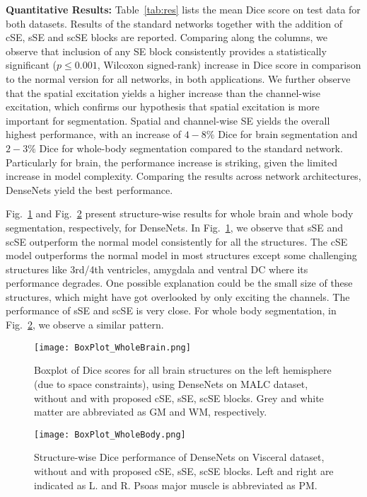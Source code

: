 \documentclass{llncs}
\begin{document}
\noindent
\textbf{Quantitative Results: }
Table~\ref{tab:res} lists the mean Dice score on test data for both datasets. Results of the standard networks together with the addition of cSE, sSE and scSE blocks are reported. Comparing along the columns, we observe that inclusion of any SE block consistently provides a statistically significant ($p\le0.001$, Wilcoxon signed-rank) increase in Dice score in comparison to the normal version for all networks, in both  applications. We further observe that the spatial excitation yields a higher increase than the channel-wise excitation, which confirms our hypothesis that spatial excitation is more important for segmentation. Spatial and channel-wise SE yields the overall highest performance, with an increase of $4-8 \%$ Dice for brain segmentation and $2-3 \%$ Dice for whole-body segmentation compared to the standard network. Particularly for brain, the performance increase is striking, given the limited increase in model complexity. Comparing the results across network architectures, DenseNets yield the best performance. 

Fig.~\ref{fig:plotBrain} and Fig.~\ref{fig:plotBody} present structure-wise results for whole brain and whole body segmentation, respectively, for DenseNets. In Fig.~\ref{fig:plotBrain}, we observe that sSE and scSE outperform the normal model consistently for all the structures. The cSE model outperforms the normal model in most structures except some challenging structures like 3rd/4th ventricles, amygdala and ventral DC where its performance degrades. One possible explanation could be the small size of these structures, which might have got overlooked by only exciting the channels. The performance of sSE and scSE is very close. For whole body segmentation, in Fig.~\ref{fig:plotBody}, we observe a similar pattern.






\begin{figure}[t]
\centering
\texttt{[image: BoxPlot\_WholeBrain.png]}
\vspace{-2mm}
\caption{Boxplot of Dice scores for all brain structures on the left hemisphere (due to space constraints), using DenseNets on MALC dataset, without and with proposed cSE, sSE, scSE blocks. Grey and white matter are abbreviated as GM and WM, respectively.}
\label{fig:plotBrain}
\end{figure}

\begin{figure}[t]
\centering
\texttt{[image: BoxPlot\_WholeBody.png]}
\vspace{-2mm}
\caption{Structure-wise Dice performance of DenseNets on Visceral dataset, without and with proposed cSE, sSE, scSE blocks. Left and right are indicated as L. and R. Psoas major muscle is abbreviated as PM.}
\label{fig:plotBody}
\end{figure}
\end{document}
